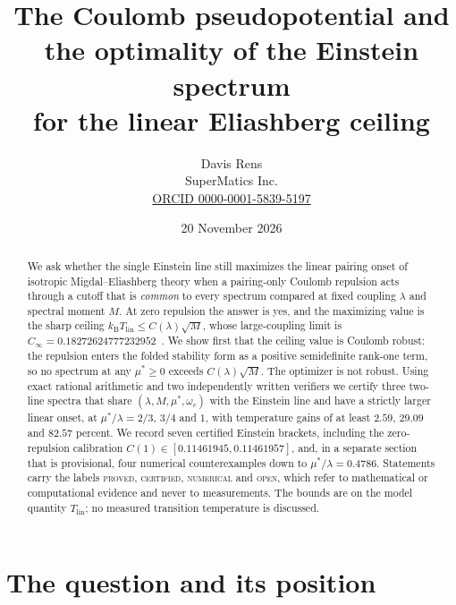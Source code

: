 \documentclass[11pt]{article}
\title{The Coulomb pseudopotential and the optimality of the Einstein spectrum\\ for the linear Eliashberg ceiling}
\author{Davis Rens\\SuperMatics Inc.\\\href{https://orcid.org/0000-0001-5839-5197}{ORCID 0000-0001-5839-5197}}
\date{20 November 2026}
\newcommand{\kb}{k_{\mathrm B}}
\newcommand{\Tlin}{T_{\mathrm{lin}}}
\newcommand{\muS}{\mu^{*}}
\theoremstyle{definition}
\theoremstyle{remark}
\begin{document}
\maketitle

\begin{abstract}
We ask whether the single Einstein line still maximizes the linear pairing onset of
isotropic Migdal--Eliashberg theory when a pairing-only Coulomb repulsion acts through a
cutoff that is \emph{common} to every spectrum compared at fixed coupling $\lambda$ and
spectral moment $M$. At zero repulsion the answer is yes, and the maximizing value is the
sharp ceiling $\kb\Tlin\le C(\lambda)\sqrt M$, whose large-coupling limit is
$C_\infty=0.18272624777232952$~\cite{univglue,anisosharp}. We show first that the ceiling value is Coulomb robust:
the repulsion enters the folded stability form as a positive semidefinite rank-one term,
so no spectrum at any $\muS\ge0$ exceeds $C(\lambda)\sqrt M$. The optimizer is not robust.
Using exact rational arithmetic and two independently written verifiers we certify three
two-line spectra that share $(\lambda,M,\muS,\omega_c)$ with the Einstein line and have a
strictly larger linear onset, at $\muS/\lambda=2/3$, $3/4$ and $1$, with temperature
gains of at least $2.59$, $29.09$ and $82.57$ percent. We record seven certified Einstein
brackets, including the zero-repulsion calibration
$C(1)\in[0.11461945,0.11461957]$, and, in a separate section that is provisional, four
numerical counterexamples down to $\muS/\lambda=0.4786$. Statements carry the labels
\textsc{proved}, \textsc{certified}, \textsc{numerical} and \textsc{open}, which refer to
mathematical or computational evidence and never to measurements. The bounds are on the
model quantity $\Tlin$; no measured transition temperature is discussed.
\end{abstract}

\section{The question and its position}
\end{document}
